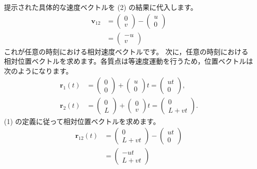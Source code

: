 \begin{solutionparts}
提示された具体的な速度ベクトルを (2) の結果に代入します。
\begin{align*}
\boldsymbol{v}_{12}
  &= \begin{pmatrix} 0 \\ v \end{pmatrix}
   - \begin{pmatrix} u \\ 0 \end{pmatrix} \\
  &= \begin{pmatrix} -u \\ v \end{pmatrix}
\end{align*}
これが任意の時刻における相対速度ベクトルです。 次に，任意の時刻における相対位置ベクトルを求めます。各質点は等速度運動を行うため，位置ベクトルは次のようになります。
\begin{align*}
\boldsymbol{r}_1(t)
  &= \begin{pmatrix} 0 \\ 0 \end{pmatrix}
   + \begin{pmatrix} u \\ 0 \end{pmatrix}t
   = \begin{pmatrix} ut \\ 0 \end{pmatrix}, \\
\boldsymbol{r}_2(t)
  &= \begin{pmatrix} 0 \\ L \end{pmatrix}
   + \begin{pmatrix} 0 \\ v \end{pmatrix}t
   = \begin{pmatrix} 0 \\ L+vt \end{pmatrix}.
\end{align*}
(1) の定義に従って相対位置ベクトルを求めます。
\begin{align*}
\boldsymbol{r}_{12}(t)
  &= \begin{pmatrix} 0 \\ L+vt \end{pmatrix}
   - \begin{pmatrix} ut \\ 0 \end{pmatrix} \\
  &= \begin{pmatrix} -ut \\ L+vt \end{pmatrix}

\end{align*}
\end{solutionparts}
